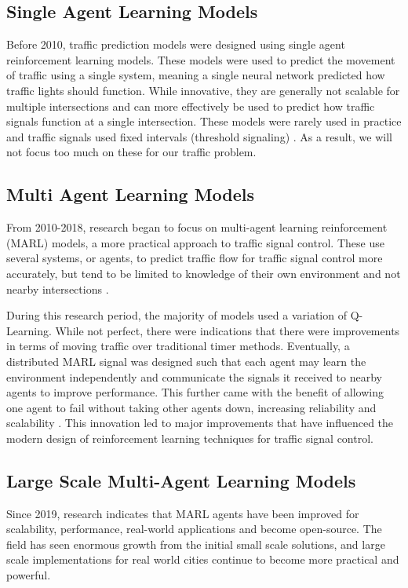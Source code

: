\documentclass[conference]{IEEEtran}
\begin{document}
\subsection{Single Agent Learning Models}

Before 2010, traffic prediction models were designed using single agent reinforcement learning models. These models were used to predict the movement of traffic using a single system, meaning a single neural network predicted how traffic lights should function. While innovative, they are generally not scalable for multiple intersections and can more effectively be used to predict how traffic signals function at a single intersection. These models were rarely used in practice and traffic signals used fixed intervals (threshold signaling) \cite{1}. As a result, we will not focus too much on these for our traffic problem. 

\subsection{Multi Agent Learning Models}

From 2010-2018, research began to focus on multi-agent learning reinforcement (MARL) models, a more practical approach to traffic signal control. These use several systems, or agents, to predict traffic flow for traffic signal control more accurately, but tend to be limited to knowledge of their own environment and not nearby intersections \cite{2}.

During this research period, the majority of models used a variation of Q-Learning. While not perfect, there were indications that there were improvements in terms of moving traffic over traditional timer methods. \cite{2} Eventually, a distributed MARL signal was designed such that each agent may learn the environment independently and communicate the signals it received to nearby agents to improve performance. This further came with the benefit of allowing one agent to fail without taking other agents down, increasing reliability and scalability \cite{5}. This innovation led to major improvements that have influenced the modern design of reinforcement learning techniques for traffic signal control. 

\subsection{Large Scale Multi-Agent Learning Models}

Since 2019, research indicates that MARL agents have been improved for scalability, performance, real-world applications and become open-source. The field has seen enormous growth from the initial small scale solutions, and large scale implementations for real world cities continue to become more practical and powerful.
\end{document}
